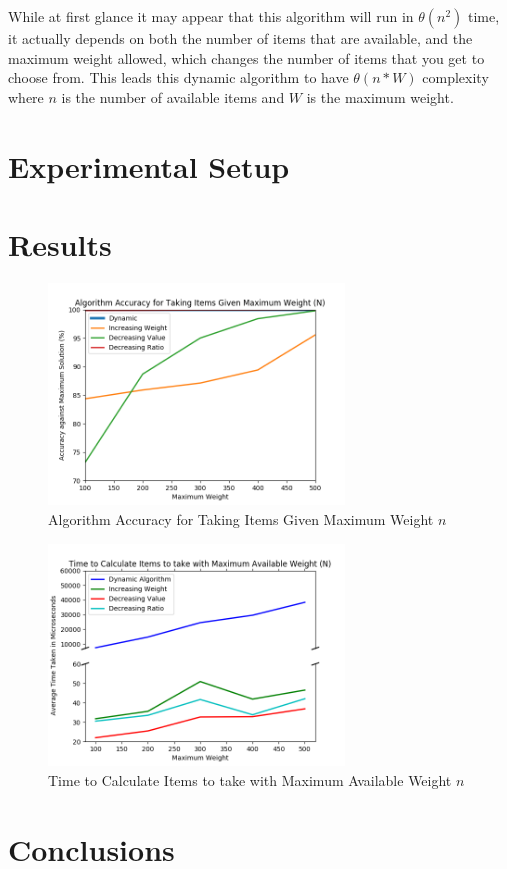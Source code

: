 \documentclass[10pt, letterpaper]{article}
\begin{document}
\medskip
While at first glance it may appear that this algorithm will run in $\theta(n^2)$ time, it actually depends on both the number of items that are available, and the maximum weight allowed, which changes the number of items that you get to choose from. This leads this dynamic algorithm to have $\theta(n * W)$ complexity where $n$ is the number of available items and $W$ is the maximum weight.
\section{Experimental Setup}


\section{Results}
	\begin{figure}[htbp]
		\begin{center}
			\includegraphics[width=0.70\textwidth]{python/accuracyGraph.png}
			\caption{Algorithm Accuracy for Taking Items Given Maximum Weight $n$}
			\label{fig:accuracy-graph}
		\end{center}
	\end{figure}
	\begin{figure}[htbp]
		\begin{center}
			\includegraphics[width=0.70\textwidth]{python/timeGraph.png}
			\caption{Time to Calculate Items to take with Maximum Available Weight $n$}
			\label{fig:time-graph}
		\end{center}
	\end{figure}

\section{Conclusions}
\end{document}
